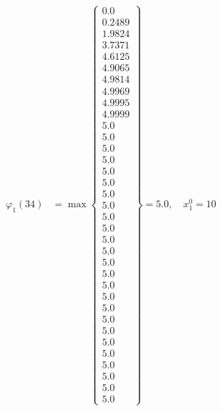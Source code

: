 \documentclass{article}
\begin{document}
\begin{align*}
  
\varphi_{1}(34) &= \max \left\{ \begin{array}{c}
0.0 \\
 0.2489 \\
 1.9824 \\
 3.7371 \\
 4.6125 \\
 4.9065 \\
 4.9814 \\
 4.9969 \\
 4.9995 \\
 4.9999 \\
 5.0 \\
 5.0 \\
 5.0 \\
 5.0 \\
 5.0 \\
 5.0 \\
 5.0 \\
 5.0 \\
 5.0 \\
 5.0 \\
 5.0 \\
 5.0 \\
 5.0 \\
 5.0 \\
 5.0 \\
 5.0 \\
 5.0 \\
 5.0 \\
 5.0 \\
 5.0 \\
 5.0 \\
 5.0 \\
 5.0 \\
 5.0 \\
 5.0
\end{array} \right\}=5.0,\quad x_{1}^0=10\\
  
  
  

\end{align*}
\end{document}
